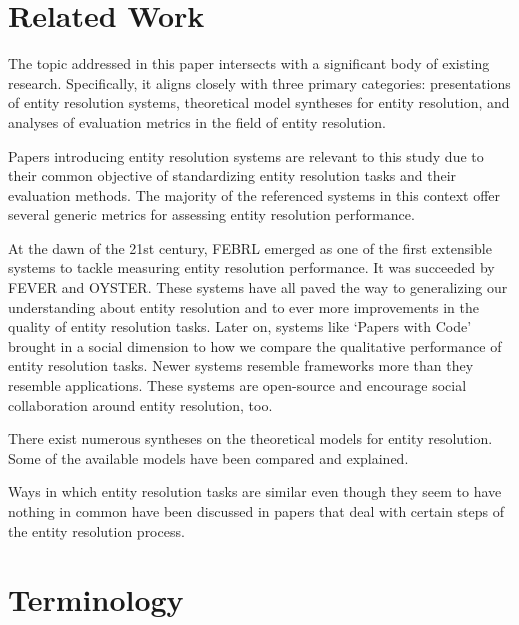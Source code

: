 \documentclass[lettersize,journal]{IEEEtran}
\begin{document}
    \section{Related Work}\label{sec:related}
    
    The topic addressed in this paper intersects with a significant body of
    existing research.
    Specifically, it aligns closely with three primary categories: presentations
    of entity resolution systems, theoretical model syntheses for entity
    resolution, and analyses of evaluation metrics in the field of entity
    resolution.

    Papers introducing entity resolution systems are relevant to this study due
    to their common objective of standardizing entity resolution tasks and their
    evaluation methods.
    The majority of the referenced systems in this context offer several generic
    metrics for assessing entity resolution performance.

    At the dawn of the 21st century, FEBRL\cite{febrl2002} emerged as one of the
    first extensible systems to tackle measuring entity resolution performance.
    It was succeeded by FEVER\cite{fever2009} and OYSTER\cite{oyster2012}. 
    These systems have all paved the way to generalizing our understanding about
    entity resolution and to ever more improvements in the quality of entity
    resolution tasks.
    Later on, systems like `Papers with Code'\cite{papwithcode2019} brought in
    a social dimension to how we compare the qualitative performance of entity
    resolution tasks.
    Newer systems resemble frameworks more than they resemble
    applications\cite{magellan2020,jedai2017}.
    These systems are open-source and encourage social collaboration around
    entity resolution, too.
    
    There exist numerous syntheses on the theoretical models for entity
    resolution\cite{fs1969,Ben2009Swoosh,Tal11}.
    Some of the available models have been compared and
    explained\cite{Tal11,tal2013}.

    Ways in which entity resolution tasks are similar even though they seem
    to have nothing in common have been discussed in papers that deal with
    certain steps of the entity resolution process\cite{Pap19,Chen09}.

    \section{Terminology}\label{sec:terminology}
\end{document}
